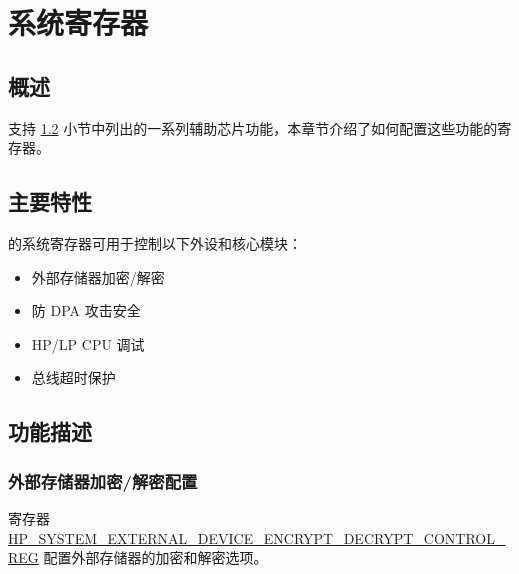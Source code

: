 \documentclass[main\_\_CN.tex]{subfiles}
\begin{document}

\ifglobal
\else
    {\let\clearpage\relax \listoftodos}
    \tableofcontents
\fi



\chapter{系统寄存器}
\label{mod:sysreg}
\hypertarget{sysreg}{}


\section{概述}

\chipname{} 支持 \ref{sec:sysreg-features} \textit{} 小节中列出的一系列辅助芯片功能，本章节介绍了如何配置这些功能的寄存器。

\section{主要特性}
\label{sec:sysreg-features}

\chipname{} 的系统寄存器可用于控制以下外设和核心模块：

\begin{itemize}
    \item 外部存储器加密/解密
    \item 防 DPA 攻击安全
    \item HP/LP CPU 调试
    \item 总线超时保护
\end{itemize}


\section{功能描述}

\subsection{外部存储器加密/解密配置}

寄存器 \hyperref[regdesc:HPSYSTEMEXTERNALDEVICEENCRYPTDECRYPTCONTROLREG]{HP\_SYSTEM\_EXTERNAL\_DEVICE\_ENCRYPT\_DECRYPT\_CONTROL\_REG} 配置外部存储器的加密和解密选项。
\end{document}
